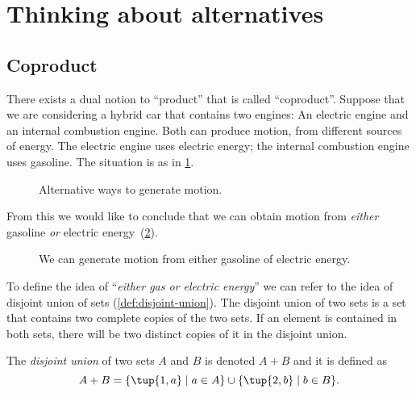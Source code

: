 \section{Thinking about alternatives}
\subsection{Coproduct}

There exists a dual notion to ``product'' that is called ``coproduct''. Suppose that we are considering a hybrid car that contains two engines: An
electric engine and an internal combustion engine. Both can produce motion, from different sources of energy. The electric engine uses electric energy; the internal combustion engine uses gasoline. The situation is as in \cref{fig:e16a}.

\begin{figure}[h!]
    \centering
    \caption{Alternative ways to generate motion. \label{fig:e16a}}
\end{figure}

From this we would like to conclude that we can obtain motion
from \emph{either} gasoline \emph{or}
electric energy~(\cref{fig:e16b}).

\begin{figure}[h!]
    \centering
    \caption{We can generate motion from either gasoline of electric energy. \label{fig:e16b}}
\end{figure}


To define the idea of ``\emph{either gas \emph{or} electric energy}'' we can
refer to the idea of disjoint union of sets (\cref{def:disjoint-union}). The
disjoint union of two sets is a set that contains two complete copies of the two
sets. If an element is contained in both sets, there will be two distinct copies of it in the disjoint union.

\begin{definition}
\label{def:disjoint-union}
    The \emph{disjoint union} of two sets $A$ and $B$ is denoted $A + B$
    and it is defined as
    \begin{equation}
        A + B=\{\tup{1,a}\mid a\in A\}\cup\{\tup{2,b}\mid b\in B\}.
    \end{equation}
\end{definition}

